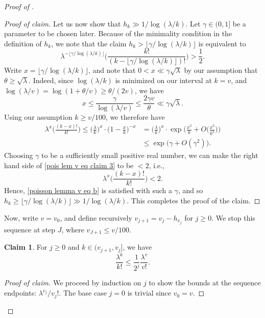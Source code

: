 \documentclass{amsart}
\theoremstyle{definition}
\newtheorem*{claim}{Claim}
\numberwithin{equation}{section}
\begin{document}
\begin{proof}[Proof of ]
\begin{proof}[Proof of claim]
		Let us now show that $h_k \gg 1/\log(\lambda/k)$. Let $\gamma \in (0,1]$ be a parameter to be chosen later. Because of the minimality condition in the definition of $h_k$, we note that the claim $h_k > \lfloor \gamma/ \log (\lambda/k) \rfloor$ is equivalent to
		\begin{equation}\label{poisson lemma v eq b}
			\lambda^{-\lfloor \gamma/ \log (\lambda/k) \rfloor} \bigg(\frac{k!}{(k-\lfloor \gamma/ \log (\lambda/k) \rfloor)!}\bigg) > \frac{1}{2}.
		\end{equation}
		Write $x = \lfloor \gamma/ \log (\lambda/k) \rfloor$, and note that $0 < x \ll \gamma \sqrt{\lambda}$ by our assumption that $\theta \geq \sqrt{\lambda}$. Indeed, since $\log(\lambda/k)$ is minimized on our interval at $k=v$, and $\log(\lambda/v) = \log(1+\theta/v) \geq \theta/(2v)$, we have
		$$ x \leq \frac{\gamma}{\log(\lambda/v)} \leq \frac{2\gamma v}{\theta} \ll \gamma \sqrt{\lambda}. $$
		Using our assumption $k \geq v/100$, we therefore have 
		\begin{align}
			\lambda^{x} \bigg(\frac{(k-x)!}{k!}\bigg) \leq \bigg(\frac{\lambda}{k}\bigg)^{x} \cdot \Big( 1-\frac{x}{k} \Big)^{-x} & = \bigg(\frac{\lambda}{k}\bigg)^{x} \cdot \exp \bigg(\frac{x^2}{k} + O\Big(\frac{x^3}{k^2}\Big)\bigg) \nonumber\\
			&\le \exp\Big(\gamma + O(\gamma^2)\Big).  \label{pois lem v eq claim 3}
		\end{align}
		Choosing $\gamma$ to be a sufficiently small positive real number, we can make the right hand side of \eqref{pois lem v eq claim 3} to be $<2$, i.e., 
		$$ \lambda^{x} \bigg(\frac{(k-x)!}{k!}\bigg) < 2. $$ 
		Hence, \eqref{poisson lemma v eq b} is satisfied with such a $\gamma$, and so $h_k \geq \lfloor \gamma / \log(\lambda/k) \rfloor \gg 1/\log(\lambda/k)$. This completes the proof of the claim.
	\end{proof}
	
	Now, write $v = v_0$, and define recursively $v_{j+1} = v_{j}-h_{v_j}$ for $j \geq 0$. We stop this sequence at step $J$, where $v_{J+1} \leq v/100$.
	\begin{claim}
		For $j \geq 0$ and $k \in (v_{j+1}, v_j]$, we have 
		$$ \frac{\lambda^k}{k!} \leq \frac{1}{2^j}\frac{\lambda^v}{v!}. $$
	\end{claim}
	\begin{proof}[Proof of claim]
		We proceed by induction on $j$ to show the bounds at the sequence endpoints: $\lambda^{v_j}/v_j!$. The base case $j=0$ is trivial since $v_0 = v$. 
		

\end{proof}
\end{proof}
\end{document}
